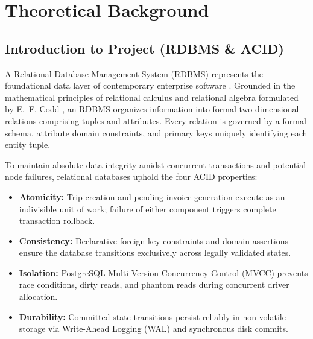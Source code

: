 \chapter{Theoretical Background}

\section{Introduction to Project (RDBMS \& ACID)}
A Relational Database Management System (RDBMS) represents the foundational data layer of contemporary enterprise software \cite{silberschatz2020}. Grounded in the mathematical principles of relational calculus and relational algebra formulated by E.~F. Codd \cite{codd1970}, an RDBMS organizes information into formal two-dimensional relations comprising tuples and attributes. Every relation is governed by a formal schema, attribute domain constraints, and primary keys uniquely identifying each entity tuple.

To maintain absolute data integrity amidst concurrent transactions and potential node failures, relational databases uphold the four ACID properties:
\begin{itemize}[itemsep=1.5pt, topsep=2pt, parsep=0pt]
    \item \textbf{Atomicity:} Trip creation and pending invoice generation execute as an indivisible unit of work; failure of either component triggers complete transaction rollback.
    \item \textbf{Consistency:} Declarative foreign key constraints and domain assertions ensure the database transitions exclusively across legally validated states.
    \item \textbf{Isolation:} PostgreSQL Multi-Version Concurrency Control (MVCC) prevents race conditions, dirty reads, and phantom reads during concurrent driver allocation.
    \item \textbf{Durability:} Committed state transitions persist reliably in non-volatile storage via Write-Ahead Logging (WAL) and synchronous disk commits.
\end{itemize}

